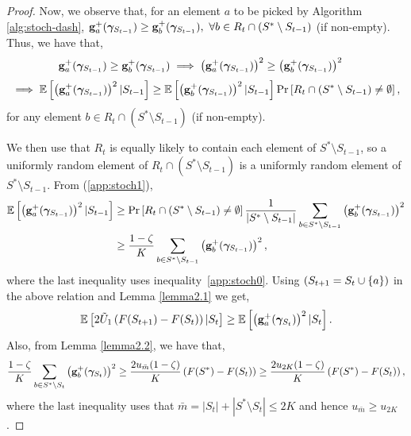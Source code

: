 \begin{proof}
Now, we observe that, for an element $a$ to be picked by Algorithm \ref{alg:stoch-dash}, $\mathbf{g}^+_a(\bm{\gamma}_{S_{t-1}})\geq \mathbf{g}^+_b(\bm{\gamma}_{S_{t-1}}),\ \forall b\in R_t\cap \left(S^*\setminus S_{t-1}\right)$ (if non-empty). Thus, we have that,
\begin{align}
\mathbf{g}^+_a(\bm{\gamma}_{S_{t-1}})\geq \mathbf{g}^+_b(\bm{\gamma}_{S_{t-1}}) &\implies \left(\mathbf{g}^+_a(\bm{\gamma}_{S_{t-1}})\right)^2 
\geq \left(\mathbf{g}^+_b(\bm{\gamma}_{S_{t-1}})\right)^2 \nonumber
\end{align}
\begin{equation}\label{app:stoch1}
    \implies \mathbb{E}\left[\left(\mathbf{g}^+_a(\bm{\gamma}_{S_{t-1}})\right)^2|S_{t-1}\right] \geq \mathbb{E}\left[\left(\mathbf{g}^+_b(\bm{\gamma}_{S_{t-1}})\right)^2|S_{t-1}\right] \Pr\left[ R_t\cap \left(S^*\setminus S_{t-1}\right)\neq \emptyset \right],
\end{equation}
for any element $b\in R_t\cap \left(S^*\setminus S_{t-1}\right)$ (if non-empty).

We then use that $R_t$ is equally likely to contain each element of $S^*\setminus S_{t-1}$, so a uniformly random element of $R_t\cap \left(S^*\setminus S_{t-1}\right)$ is a uniformly random element of $S^*\setminus S_{t-1}$. From (\ref{app:stoch1}), 
\begin{align}\label{app:stoch2}
\mathbb{E}\left[\left(\mathbf{g}^+_a(\bm{\gamma}_{S_{t-1}})\right)^2|S_{t-1}\right] & \geq \Pr\left[ R_t\cap \left(S^*\setminus S_{t-1}\right)\neq \emptyset \right]\frac{1}{|S^*\setminus S_{t-1}|}\sum_{b\in S^*\setminus S_{t-1}}\left(\mathbf{g}^+_b(\bm{\gamma}_{S_{t-1}})\right)^2\nonumber\\
& \geq \frac{1-\zeta}{K} \sum_{b\in S^*\setminus S_{t-1}}\left(\mathbf{g}^+_b(\bm{\gamma}_{S_{t-1}})\right)^2,
\end{align}
where the last inequality uses inequality~\ref{app:stoch0}.
Using $(S_{t+1}= S_t\cup \{a\})$ in the above relation and Lemma \ref{lemma2.1} we get,
\begin{equation}\label{app:stoch3}
\mathbb{E}\left[2\tilde{U}_1\left(F(S_{t+1})- F(S_t)\right)|S_t\right]\geq \mathbb{E}\left[ \left(\mathbf{g}^+_a(\bm{\gamma}_{S_t}) \right)^2|S_t \right].
\end{equation}
Also, from Lemma \ref{lemma2.2}, we have that,
\begin{equation}\label{app:stoch4}
\frac{1-\zeta}{K}\sum_{b\in S^*\setminus S_t} \left( \mathbf{g}^+_b(\bm{\gamma}_{S_t}) \right)^2\geq \frac{2u_{\bar{m}}(1-\zeta)}{K} \left( F(S^*)-F(S_t)\right)\geq \frac{2u_{2K}(1-\zeta)}{K} \left( F(S^*)-F(S_t)\right),
\end{equation}
where the last inequality uses that $\bar{m} = |S_t| + |S^*\setminus S_t|\leq 2K$ and hence $u_{\bar{m}} \geq u_{2K}$.


\end{proof}
